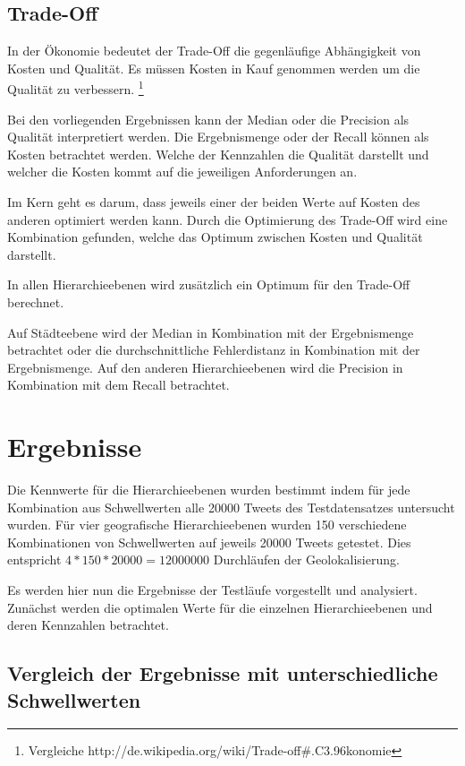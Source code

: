 		\subsection{Trade-Off}

			In der Ökonomie bedeutet der Trade-Off die gegenläufige Abhängigkeit von Kosten und Qualität.
			Es müssen Kosten in Kauf genommen werden um die Qualität zu verbessern. \footnote{Vergleiche http://de.wikipedia.org/wiki/Trade-off\#.C3.96konomie} 
			
			Bei den vorliegenden Ergebnissen kann der Median oder die Precision als Qualität interpretiert werden.
			Die Ergebnismenge oder der Recall können als Kosten betrachtet werden.
			Welche der Kennzahlen die Qualität darstellt und welcher die Kosten kommt auf die jeweiligen Anforderungen an. 

			Im Kern geht es darum, dass jeweils einer der beiden Werte auf Kosten des anderen optimiert werden kann.
			Durch die Optimierung des Trade-Off wird eine Kombination gefunden, welche das Optimum zwischen Kosten und Qualität darstellt.

			In allen Hierarchieebenen wird zusätzlich ein Optimum für den Trade-Off berechnet. 

			Auf Städteebene wird der Median in Kombination mit der Ergebnismenge betrachtet oder die durchschnittliche Fehlerdistanz in Kombination mit der Ergebnismenge.
			Auf den anderen Hierarchieebenen wird die Precision in Kombination mit dem Recall betrachtet.

	\section{Ergebnisse}

		Die Kennwerte für die Hierarchieebenen wurden bestimmt indem für jede Kombination aus Schwellwerten alle 20000 Tweets des Testdatensatzes untersucht wurden.
		Für vier geografische Hierarchieebenen wurden 150 verschiedene Kombinationen von Schwellwerten auf jeweils 20000 Tweets getestet.
		Dies entspricht $4*150*20000 = 12000000$ Durchläufen der Geolokalisierung.

		Es werden hier nun die Ergebnisse der Testläufe vorgestellt und analysiert.
		Zunächst werden die optimalen Werte für die einzelnen Hierarchieebenen und deren Kennzahlen betrachtet.


		\subsection{Vergleich der Ergebnisse mit unterschiedliche Schwellwerten} 

